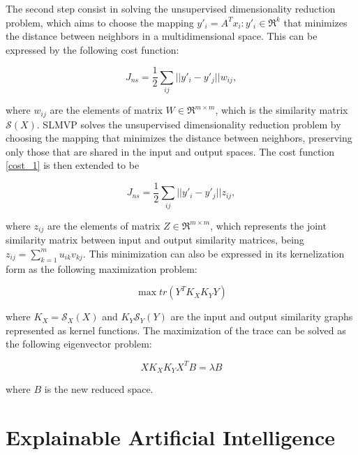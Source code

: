 The second step consist in solving the unsupervised dimensionality reduction problem, which aims to choose the mapping $y'_i = A^T x_i : y'_i \in \mathfrak{R}^k$ that minimizes the distance between neighbors in a multidimensional space. This can be expressed by the following cost function:

\begin{equation}\label{cost_1}
    J_{ns} = \frac{1}{2} \sum_{ij} || y'_i - y'_j || w_{ij},
\end{equation}

where $w_{ij}$ are the elements of matrix $W \in \mathfrak{R}^{m \times m}$, which is the similarity matrix $\mathscr{S}(X)$.
SLMVP solves the unsupervised dimensionality reduction problem  by choosing the mapping that  minimizes the distance between neighbors, preserving only those that are shared in the input and output spaces. The cost function \ref{cost_1} is then extended to be

\begin{equation}
    J_{ns} = \frac{1}{2} \sum_{ij} || y'_i - y'_j || z_{ij},
\end{equation}

where $z_{ij}$ are the elements of matrix $Z \in \mathfrak{R}^{m \times m}$, which represents the joint similarity matrix between input and output similarity matrices, being $z_{ij} = \sum^m_{k=1} u_{ik}v_{kj}$. This minimization can also be expressed in its kernelization form as the following maximization problem:

\begin{equation}
    \max tr(Y^T K_X K_Y Y)
\end{equation}

where $K_X = \mathscr{S}_X(X)$ and $K_Y \mathscr{S}_Y(Y)$ are the input and output similarity graphs represented as kernel functions. The maximization of the trace can be solved as the following eigenvector problem:

\begin{equation}
    X K_X K_Y X^T B = \lambda B
\end{equation}

where $B$ is the new reduced space.

\section{Explainable Artificial Intelligence}

